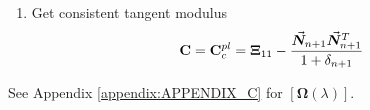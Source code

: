 {\begin{tcolorbox}
\begin{enumerate}
			\vspace{-1.7cm}
			\hspace{-0.15cm}\begin{minipage}[t]{0.3\linewidth}
				\begin{alignat*}{2}
					\blacksquare\hspace{0.3cm}	&\bvec{\zeta}_{n+1} &&=
					[\bm{\Omega}(\lambda)]\bvec{\zeta}_{n+1}^{TR}\\
					\blacksquare\hspace{0.3cm}	&\bvec{\epsilon}^{pl}_{n+1} &&= 
					\bvec{\epsilon}^{pl}_n + \lambda\bvec{n}_{n+1}\\
					\blacksquare\hspace{0.3cm}	&\bvec{\alpha}_{n+1} &&= 
					\bvec{\alpha}_n + \lambda 
					H_{kin}\bmat{V}^{-1}\bvec{n}_{n+1}\\
				\end{alignat*}
			\end{minipage}
			\begin{minipage}[t]{0.4\linewidth}
				\begin{alignat*}{2}
					\blacksquare\hspace{0.3cm} &\bvec{\sigma}_{n+1} &&= 
					\bvec{\zeta}_{n+1} + \bvec{\alpha}_{n+1}\\
					\blacksquare\hspace{0.3cm} &e^{pl}_{n+1} &&= e^{pl}_n + 
					\lambda \\
					\blacksquare\hspace{0.3cm}	&q_{n+1} &&= q_n + 
					\lambda\frac{\partial
						q_{n+1}}{\partial e_{n+1}^{pl}}
				\end{alignat*}
			\end{minipage}
			
			\vspace{-0.5cm}
			\item Get consistent tangent modulus
			\vspace{-0.5cm}
			$$\mathbf{C}=\mathbf{C}_c^{pl} = 
			\mathbf{\Xi}_{11}-\frac{\vec{\boldsymbol{N}}_{n+1}\vec{\boldsymbol{N}}_{n+1}^T}{1+\delta_{n+1}}$$
		\end{enumerate}
		See Appendix \ref{appendix:APPENDIX_C} for $[\bm{\Omega}(\lambda)]$.
		\step\label{Box:BOX1}
	\end{tcolorbox}
}


